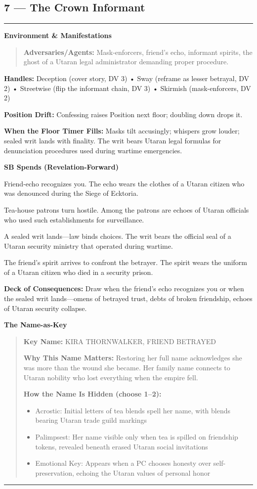 \documentclass[18pt, letterpaper, twoside]{article}
\newenvironment{floorbox}[1]{%
    \begin{center}
    \begin{minipage}{0.95\textwidth}
    \subsection*{#1}
    \vspace{-0.5em}
    \rule{\textwidth}{0.5pt}
    \vspace{0.5em}
}{%
    \vspace{0.5em}
    \rule{\textwidth}{0.5pt}
    \end{minipage}
    \end{center}
}
\newenvironment{gmnote}[1]{%
    \vspace{0.5em}
    \noindent\textbf{#1}
    \begin{quote}
}{%
    \end{quote}
    \vspace{0.5em}
}
\newcommand{\handles}[1]{\noindent\textbf{Handles:} #1\par}
\newcommand{\sbitem}[2]{\item[#1 SB:] #2}
\newcommand{\deckdraw}[1]{\noindent\textbf{Deck of Consequences:} #1\par}
\newcommand{\keyname}[1]{\noindent\textbf{Key Name:} #1\par}
\newcommand{\nameimportance}[1]{\noindent\textbf{Why This Name Matters:} #1\par}
\begin{document}
\begin{floorbox}{7 --- The Crown Informant}
\begin{gmnote}{Environment \& Manifestations}
\textbf{Adversaries/Agents:} Mask-enforcers, friend's echo, informant spirits, the ghost of a Utaran legal administrator demanding proper procedure.
\end{gmnote}

\handles{Deception (cover story, DV 3) • Sway (reframe as lesser betrayal, DV 2) • Streetwise (flip the informant chain, DV 3) • Skirmish (mask-enforcers, DV 2)}

\textbf{Position Drift:} Confessing raises Position next floor; doubling down drops it.

\textbf{When the Floor Timer Fills:} Masks tilt accusingly; whispers grow louder; sealed writ lands with finality. The writ bears Utaran legal formulas for denunciation procedures used during wartime emergencies.

\textbf{SB Spends (Revelation-Forward)}
\begin{description}[leftmargin=*, style=unboxed]
    \sbitem{1}{Friend-echo recognizes you. The echo wears the clothes of a Utaran citizen who was denounced during the Siege of Ecktoria.}
    \sbitem{2}{Tea-house patrons turn hostile. Among the patrons are echoes of Utaran officials who used such establishments for surveillance.}
    \sbitem{3}{A sealed writ lands---law binds choices. The writ bears the official seal of a Utaran security ministry that operated during wartime.}
    \sbitem{4+}{The friend's spirit arrives to confront the betrayer. The spirit wears the uniform of a Utaran citizen who died in a security prison.}
\end{description}

\deckdraw{Draw when the friend's echo recognizes you or when the sealed writ lands---omens of betrayed trust, debts of broken friendship, echoes of Utaran security collapse.}

\begin{gmnote}{The Name-as-Key}
\keyname{KIRA THORNWALKER, FRIEND BETRAYED}
\nameimportance{Restoring her full name acknowledges she was more than the wound she became. Her family name connects to Utaran nobility who lost everything when the empire fell.}

\textbf{How the Name Is Hidden (choose 1--2):}
\begin{itemize}[leftmargin=*]
    \item Acrostic: Initial letters of tea blends spell her name, with blends bearing Utaran trade guild markings
    \item Palimpsest: Her name visible only when tea is spilled on friendship tokens, revealed beneath erased Utaran social invitations
    \item Emotional Key: Appears when a PC chooses honesty over self-preservation, echoing the Utaran values of personal honor
\end{itemize}


\end{gmnote}
\end{floorbox}
\end{document}
